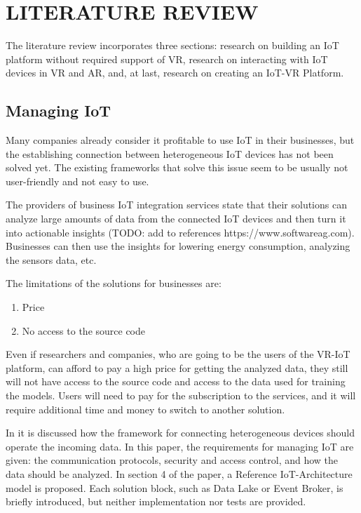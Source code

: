 
\chapter{LITERATURE REVIEW}


The literature review incorporates three sections: research on building an IoT platform without required support of VR, research on interacting with IoT devices in VR and AR, and, at last, research on creating an IoT-VR Platform.

\section{Managing IoT}

Many companies already consider it profitable to use IoT in their businesses, but the establishing connection between heterogeneous IoT devices has not been solved yet. The existing frameworks that solve this issue seem to be usually not user-friendly and not easy to use. 

The providers of business IoT integration services state that their solutions can analyze large amounts of data from the connected IoT devices and then turn it into actionable insights (TODO: add to references https://www.softwareag.com). Businesses can then use the insights for lowering energy consumption, analyzing the sensors data, etc.

The limitations of the solutions for businesses are:
\begin{enumerate}
    \item Price
    \item No access to the source code
\end{enumerate}

Even if researchers and companies, who are going to be the users of the VR-IoT platform, can afford to pay a high price for getting the analyzed data, they still will not have access to the source code and access to the data used for training the models. Users will need to pay for the subscription to the services, and it will require additional time and money to switch to another solution.

In \cite{k_mohapatra_solution_2016} it is discussed how the framework for connecting heterogeneous devices should operate the incoming data. In this paper, the requirements for managing IoT are given: the communication protocols, security and access control, and how the data should be analyzed. In section 4 of the paper, a Reference IoT-Architecture model is proposed. Each solution block, such as Data Lake or Event Broker, is briefly introduced, but neither implementation nor tests are provided.


